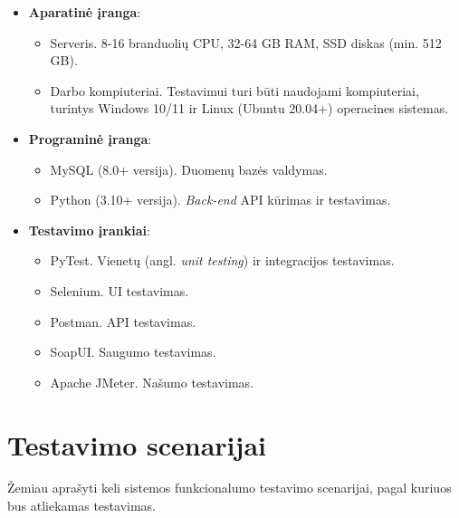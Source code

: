 \documentclass[12pt]{article}
\begin{document}
\begin{itemize}
    \item \textbf{Aparatinė įranga}:
    \begin{itemize}[label=$\circ$]
        \item Serveris. 8-16 branduolių CPU, 32-64 GB RAM, SSD diskas (min.
        512 GB).
        \item Darbo kompiuteriai. Testavimui turi būti naudojami kompiuteriai,
        turintys Windows 10/11 ir Linux (Ubuntu 20.04+) operacines sistemas.
    \end{itemize}
    \item \textbf{Programinė įranga}:
    \begin{itemize}[label=$\circ$]
        \item MySQL (8.0+ versija). Duomenų bazės valdymas.
        \item Python (3.10+ versija). \emph{Back-end} API kūrimas ir testavimas.
    \end{itemize}
    \item \textbf{Testavimo įrankiai}:
    \begin{itemize}[label=$\circ$]
        \item PyTest. Vienetų (angl. \emph{unit testing}) ir integracijos
        testavimas.
        \item Selenium. UI testavimas.
        \item Postman. API testavimas.
        \item SoapUI. Saugumo testavimas.
        \item Apache JMeter. Našumo testavimas.
    \end{itemize}
\end{itemize}

\newpage


\section{Testavimo scenarijai}
Žemiau aprašyti keli sistemos funkcionalumo testavimo scenarijai, pagal kuriuos
bus atliekamas testavimas.
\end{document}
